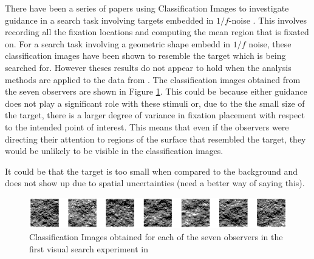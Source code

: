 \par

There have been a series of papers using Classification Images to investigate guidance in a search task involving targets embedded in $1/f$-noise \citep{rajashekar2002, rajashekar2006, tavassoli2009}. This involves recording all the fixation locations and computing the mean region that is fixated on. For a search task involving a geometric shape embedd in $1/f$ noise, these classification images have been shown to resemble the target which is being searched for. However theses results do not appear to hold when the analysis methods are applied to the data from \cite{clarke2009}. The classification images obtained from the seven observers are shown in Figure \ref{fig:CIresults}. This could be because either guidance does not play a significant role with these stimuli or, due to the the small size of the target, there is a larger degree of variance in fixation placement with respect to the intended point of interest. This means that even if the observers were directing their attention to regions of the surface that resembled the target, they would be unlikely to be visible in the classification images. 

It could be that the target is too small when compared to the background and does not show up due to spatial uncertainties (need a better way of saying this). 

\begin{figure}
	\centering
		\includegraphics[width=14cm]{figures/CIresults.eps}
	\caption{Classification Images obtained for each of the seven observers in the first visual search experiment in \cite{clarke2009}}
	\label{fig:CIresults}
\end{figure}

